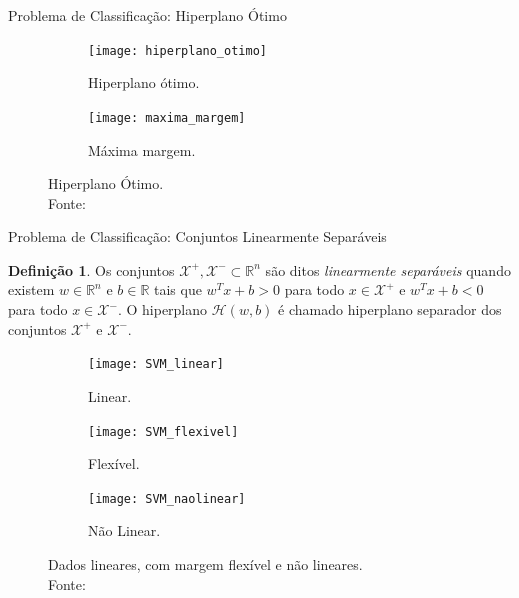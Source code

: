 \documentclass{beamer}
\def\Xset{\mathcal{X}}
\def\Hset{\mathcal{H}}
\def\RR{\mathds{R}}
\theoremstyle{definition}%
\newtheorem{defi}{Definição}
\begin{document}
\begin{frame}{Problema de Classificação: Hiperplano Ótimo}
\begin{figure}[h] 
	\centering
	\begin{subfigure}[h]{0.4\textwidth}
		\centering
		\texttt{[image: hiperplano\_otimo]}
		\caption{Hiperplano ótimo. \label{fig3:a}}
	\end{subfigure}
	\begin{subfigure}[h]{0.4\textwidth}
		\centering
		\texttt{[image: maxima\_margem]}
		\caption{Máxima margem. \label{fig3:b}}	
	\end{subfigure}
	\caption{Hiperplano Ótimo. \label{fig3}
		\\ Fonte: \textcite{Evelin2017}}
\end{figure}
\end{frame}


\begin{frame}{Problema de Classificação: Conjuntos Linearmente Separáveis}
\begin{defi} \label{def1} Os conjuntos $\Xset^{+}, \Xset^{-} \subset \RR^n$ são ditos \emph{linearmente separáveis} quando existem $w\in \RR^n$ e $b\in \RR$  tais que $w^{T}x+b>0$ para todo $x\in \Xset^{+}$ e $w^{T}x+b<0$ para todo $x\in \Xset^{-}$. O hiperplano $\Hset(w,b)$ é chamado hiperplano separador dos conjuntos $\Xset^{+}$ e $\Xset^{-}$.
\end{defi}

\begin{figure}[!h] 
	\centering
	\begin{subfigure}[h]{0.20\textwidth}
		\centering
		\texttt{[image: SVM\_linear]}
		\caption{Linear. \label{fig1:a}}
	\end{subfigure}
	\begin{subfigure}[!h]{0.20\textwidth}
		\centering
		\texttt{[image: SVM\_flexivel]}
		\caption{Flexível. \label{fig1:b}}
	\end{subfigure}
	\begin{subfigure}[!h]{0.20\textwidth}
		\centering
		\texttt{[image: SVM\_naolinear]}
		\caption{Não Linear. \label{fig1:c}}
	\end{subfigure}
	\caption{Dados lineares, com margem flexível e não lineares. \label{fig1}\\ Fonte: \textcite{Evelin2017}}
\end{figure}
\end{frame}
\end{document}
